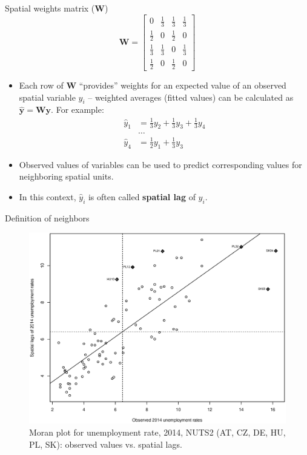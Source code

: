 \documentclass{beamer}
\begin{document}
\begin{frame}{Spatial weights matrix ($\bm{W}$)}
\vspace{-0.2cm}
$$
\bm{W}=
\begin{bmatrix}
0 & \tfrac{1}{3} & \tfrac{1}{3} & \tfrac{1}{3} \\[2pt]
\tfrac{1}{2} & 0 & \tfrac{1}{2} & 0 \\[2pt]
\tfrac{1}{3} & \tfrac{1}{3} & 0 & \tfrac{1}{3} \\[2pt]
\tfrac{1}{2} & 0 & \tfrac{1}{2} & 0
\end{bmatrix}
$$
\begin{itemize}
	\item Each row of $\bm{W}$ ``provides'' weights for an expected value of an observed spatial variable $y_i$ -- weighted averages (fitted values) can be calculated as $\hat{\bm{y}} = \bm{W \! y}$. For example:
	\begin{align*}
	\hat{y}_1 & =  \tfrac{1}{3} y_2 + \tfrac{1}{3} y_3 + \tfrac{1}{3} y_4 \\
	&\dots \\
	\hat{y}_4 & = \tfrac{1}{2} y_1  + \tfrac{1}{3} y_3 
	\end{align*}
	\item Observed values of variables can be used to predict corresponding values for neighboring spatial units.
	\smallskip
	\item In this context, $\hat{y}_i$ is often called \textbf{spatial lag} of $y_i$.
\end{itemize}
\end{frame}
\begin{frame}{Definition of neighbors}
\vspace{-0.3cm}
\begin{figure}
	\includegraphics[width=.7\textwidth]{IMG/sp_MoranPlot.eps}
	\caption[]{Moran plot for unemployment rate, 2014, NUTS2 (AT, CZ, DE, HU, PL, SK): observed values vs. spatial lags.}
\end{figure}
\end{frame}
\end{document}
